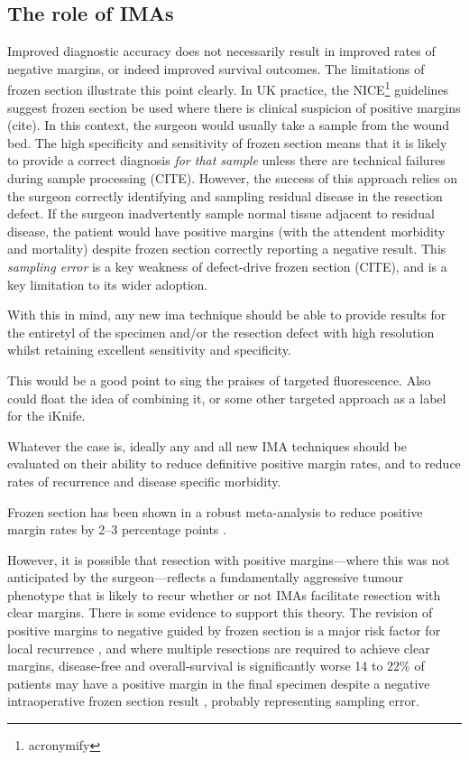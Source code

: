 \subsection{The role of IMAs}

Improved diagnostic accuracy does not necessarily result in improved rates of negative margins, or indeed improved survival outcomes.
The limitations of frozen section illustrate this point clearly.
In UK practice, the NICE\footnote{acronymify} guidelines suggest frozen section be used where there is clinical suspicion of positive margins (cite).
In this context, the surgeon would usually take a sample from the wound bed.
The high specificity and sensitivity of frozen section means that it is likely to provide a correct diagnosis \textit{for that sample} unless there are technical failures during sample processing (CITE).
However, the success of this approach relies on the surgeon correctly identifying and sampling residual disease in the resection defect. 
If the surgeon inadvertently sample normal tissue adjacent to residual disease, the patient would have positive margins (with the attendent morbidity and mortality) despite frozen section correctly reporting a negative result.
This \textit{sampling error} is a key weakness of defect-drive frozen section (CITE), and is a key limitation to its wider adoption.

With this in mind, any new \gls{ima} technique should be able to provide results for the entiretyl of the specimen and/or the resection defect with high resolution whilst retaining excellent sensitivity and specificity.

This would be a good point to sing the praises of targeted fluorescence.
Also could float the idea of combining it, or some other targeted approach as a label for the iKnife.


Whatever the case is, ideally any and all new \gls{IMA} techniques should be evaluated on their ability to reduce definitive positive margin rates, and to reduce rates of recurrence and disease specific morbidity.

Frozen section has been shown in a robust meta-analysis to reduce positive margin rates by 2--3 percentage points \cite{gorpheSystematicReviewMetaanalysis2019}.

However, it is possible that resection with positive margins---where this was not anticipated by the surgeon---reflects a fundamentally aggressive tumour phenotype that is likely to recur whether or not IMAs facilitate resection with clear margins.
There is some evidence to support this theory.
The revision of positive margins to negative guided by frozen section is a major risk factor for local recurrence \cite{ettlt.PositiveFrozenSection2016}, and where multiple resections are required to achieve clear margins, disease-free and overall-survival is significantly worse \cite{mooreTransoralRoboticSurgery2018}
14 to 22\% of patients may have a positive margin in the final specimen despite a negative intraoperative frozen section result \cite{ordAccuracyFrozenSections1997, due.RefiningUtilityRole2016}, probably representing sampling error.
